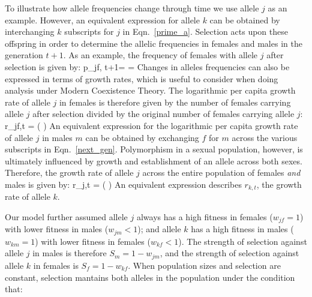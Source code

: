 \documentclass[12pt]{article}
\let\oldequation\equation
\let\oldendequation\endequation
\renewenvironment{equation}
  {\linenomathNonumbers\oldequation}
  {\oldendequation\endlinenomath}
\begin{document}
To illustrate how allele frequencies change through time we use allele $j$ as an example. However, an equivalent expression for allele $k$ can be obtained by interchanging $k$ subscripts for $j$ in Eqn.~\ref{prime_a}. Selection acts upon these offspring in order to determine the allelic frequencies in females and males in the generation $t+1$. As an example, the frequency  of females with allele $j$ after selection is given by:
\begin{equation}
   p_{jf, t+1}=  = 
   \label{next_gen}
\end{equation}
Changes in alleles frequencies can also be expressed in terms of growth rates, which is useful to consider when doing analysis under Modern Coexistence Theory. The logarithmic per capita growth rate of allele $j$ in females is therefore given by the number of females carrying allele $j$ after selection divided by the original number of females carrying allele $j$:
\begin{equation}
    r_{jf,t} = \ln \left(  \right)
    \label{canonical}
\end{equation}
An equivalent expression for the logarithmic per capita growth rate of allele $j$ in males $m$ can be obtained by exchanging $f$ for $m$ across the various subscripts in Eqn.~\ref{next_gen}. Polymorphism in a sexual population, however, is ultimately influenced by growth and establishment of an allele across both sexes. Therefore, the growth rate of allele $j$ across the entire population of females \emph{and} males is given by:
\begin{equation}
    r_{j,t} = \ln \left(   \right)
    \label{full}
\end{equation}
An equivalent expression describes $r_{k,t}$, the growth rate of allele $k$.


Our model further assumed allele $j$ always has a high fitness in females ($w_{jf} = 1$) with lower fitness in males ($w_{jm} < 1$); and allele $k$ has a high fitness in males ($w_{km} = 1$)  with lower fitness in females ($w_{kf} < 1 $). The strength of selection against allele $j$ in males is therefore $S_{m}= 1 - w_{jm}$, and the strength of selection against allele $k$ in females is $S_{f}= 1 - w_{kf}$. When population sizes and selection are constant,
selection mantains both alleles in the population under the condition that:
\end{document}
